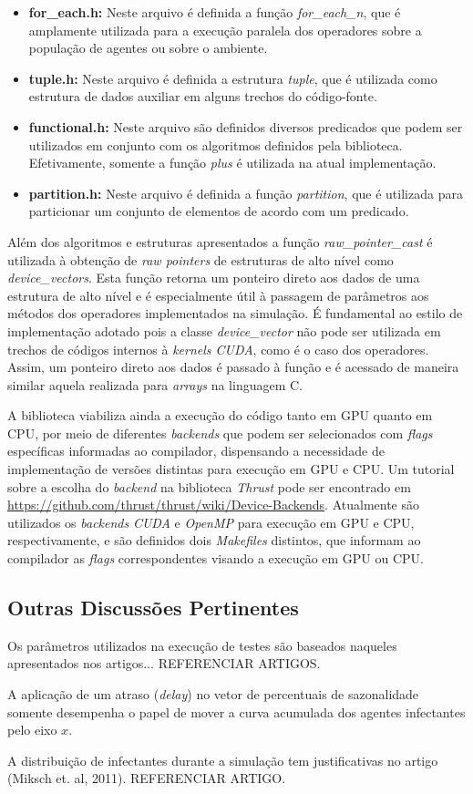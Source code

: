 \begin{itemize}
 \item \textbf{for\_each.h:} Neste arquivo é definida a função \textit{for\_each\_n}, que é amplamente utilizada para a execução paralela dos operadores sobre a população de agentes ou sobre o ambiente. 
 \item \textbf{tuple.h:} Neste arquivo é definida a estrutura \textit{tuple}, que é utilizada como estrutura de dados auxiliar em alguns trechos do código-fonte. 
 \item \textbf{functional.h:} Neste arquivo são definidos diversos predicados que podem ser utilizados em conjunto com os algoritmos definidos pela biblioteca. Efetivamente, somente a função \textit{plus} é utilizada na atual implementação. 
 \item \textbf{partition.h:} Neste arquivo é definida a função \textit{partition}, que é utilizada para particionar um conjunto de elementos de acordo com um predicado. 
\end{itemize}

Além dos algoritmos e estruturas apresentados a função \textit{raw\_pointer\_cast} é utilizada à obtenção de \textit{raw pointers} de estruturas de alto nível como \textit{device\_vectors}. Esta função retorna um ponteiro direto aos dados de uma estrutura de alto nível e é especialmente útil à passagem de parâmetros aos métodos dos operadores implementados na simulação. É fundamental ao estilo de implementação adotado pois a classe \textit{device\_vector} não pode ser utilizada em trechos de códigos internos à \textit{kernels CUDA}, como é o caso dos operadores. Assim, um ponteiro direto aos dados é passado à função e é acessado de maneira similar aquela realizada para \textit{arrays} na linguagem C. 

A biblioteca viabiliza ainda a execução do código tanto em GPU quanto em CPU, por meio de diferentes \textit{backends} que podem ser selecionados com \textit{flags} específicas informadas ao compilador, dispensando a necessidade de implementação de versões distintas para execução em GPU e CPU. Um tutorial sobre a escolha do \textit{backend} na biblioteca \textit{Thrust} pode ser encontrado em \url{https://github.com/thrust/thrust/wiki/Device-Backends}. Atualmente são utilizados os \textit{backends} \textit{CUDA} e \textit{OpenMP} para execução em GPU e CPU, respectivamente, e são definidos dois \textit{Makefiles} distintos, que informam ao compilador as \textit{flags} correspondentes visando a execução em GPU ou CPU. 

\subsection{Outras Discussões Pertinentes}

Os parâmetros utilizados na execução de testes são baseados naqueles apresentados nos artigos... {\color{red} REFERENCIAR ARTIGOS. }

A aplicação de um atraso (\textit{delay}) no vetor de percentuais de sazonalidade somente desempenha o papel de mover a curva acumulada dos agentes infectantes pelo eixo $x$. 

A distribuição de infectantes durante a simulação tem justificativas no artigo (Miksch et. al, 2011). {\color{red} REFERENCIAR ARTIGO. }

\newpage